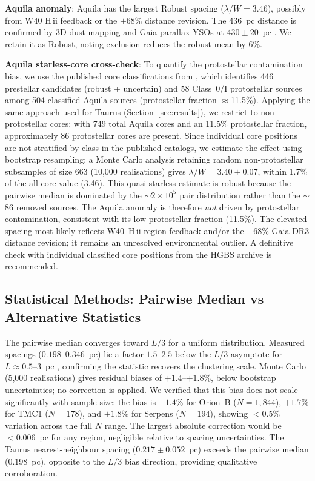\documentclass[twoside,twocolumn]{mnras}
\begin{document}
\textbf{Aquila anomaly}: Aquila has the largest Robust spacing ($\lambda/W = 3.46$),
possibly from W40 H\,{\sc ii} feedback \citep{Bontemps2010} or the $+68\%$ distance
revision. The 436~pc distance is confirmed by 3D dust mapping \citep{Zucker2020} and
Gaia-parallax YSOs at $430 \pm 20$~pc \citep{Konyves2020}. We retain it as Robust,
noting exclusion reduces the robust mean by 6\%.

\textbf{Aquila starless-core cross-check}: To quantify the protostellar contamination
bias, we use the published core classifications from \citet{Konyves2015}, which
identifies 446 prestellar candidates (robust + uncertain) and 58 Class~0/I protostellar
sources among 504 classified Aquila sources (protostellar fraction $\approx$11.5\%).
Applying the same approach used for Taurus (Section~\ref{sec:results}), we restrict to
non-protostellar cores: with 749 total Aquila cores and an 11.5\% protostellar fraction,
approximately 86 protostellar cores are present. Since individual core positions are not stratified by class in the published catalogs,
we estimate the effect using bootstrap resampling: a Monte Carlo analysis retaining
random non-protostellar subsamples of size 663 (10,000 realisations) gives
$\lambda/W = 3.40 \pm 0.07$, within 1.7\% of the all-core value (3.46). This
quasi-starless estimate is robust because the pairwise median is dominated by the
$\sim$$2\times10^5$ pair distribution rather than the $\sim$86 removed sources.
The Aquila anomaly is therefore \textit{not} driven by protostellar contamination,
consistent with its low protostellar fraction (11.5\%). The elevated spacing most
likely reflects W40~H\,{\sc ii} region feedback \citep{Bontemps2010} and/or the
$+68\%$ Gaia DR3 distance revision; it remains an unresolved environmental outlier.
A definitive check with individual classified core positions from the HGBS archive
is recommended.

\subsection{Statistical Methods: Pairwise Median vs Alternative Statistics}
\label{sec:statistics}

The pairwise median converges toward $L/3$ for a uniform distribution. Measured spacings
($0.198$--$0.346$~pc) lie a factor $1.5$--$2.5$ below the $L/3$ asymptote for
$L \approx 0.5$--$3$~pc \citep{Arzoumanian2019}, confirming the statistic recovers the
clustering scale. Monte Carlo (5,000 realisations) gives residual biases of $+1.4$--$+1.8\%$,
below bootstrap uncertainties; no correction is applied. We verified that this bias
does not scale significantly with sample size: the bias is $+1.4\%$ for Orion~B
($N=1{,}844$), $+1.7\%$ for TMC1 ($N=178$), and $+1.8\%$ for Serpens ($N=194$),
showing $<0.5\%$ variation across the full $N$ range. The largest absolute correction
would be $< 0.006$~pc for any region, negligible relative to spacing uncertainties.
The Taurus nearest-neighbour spacing ($0.217 \pm 0.052$~pc) exceeds the pairwise
median ($0.198$~pc), opposite to the $L/3$ bias direction, providing qualitative
corroboration.
\end{document}
